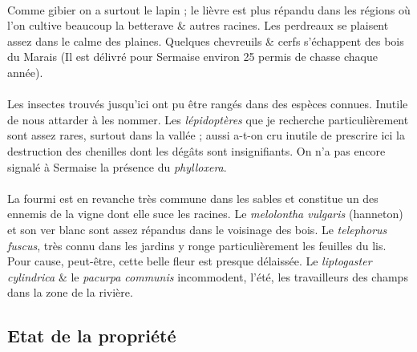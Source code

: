 \documentclass[../eBook.tex]{subfiles}
\begin{document}
    \paragraph{}Comme gibier on a surtout le lapin ; le lièvre est plus répandu dans les régions où l'on cultive beaucoup la betterave \& autres racines. Les perdreaux se plaisent assez dans le calme des plaines. Quelques chevreuils \& cerfs s'échappent des bois du Marais (Il est délivré pour Sermaise environ 25 permis de chasse chaque année).
    \paragraph{}Les insectes trouvés jusqu'ici ont pu être rangés dans des espèces connues. Inutile de nous attarder à les nommer. Les \textit{lépidoptères} que je recherche particulièrement sont assez rares, surtout dans la vallée ; aussi a-t-on cru inutile de prescrire ici la destruction des chenilles dont les dégâts sont insignifiants. On n'a pas encore signalé à Sermaise la présence du \textit{phylloxera}.
    \paragraph{}La fourmi est en revanche très commune dans les sables et constitue un des ennemis de la vigne dont elle suce les racines. Le \textit{melolontha vulgaris} (hanneton) et son ver blanc sont assez répandus dans le voisinage des bois. Le \textit{telephorus fuscus}, très connu dans les jardins y ronge particulièrement les feuilles du lis. Pour cause, peut-être, cette belle fleur est presque délaissée. Le \textit{liptogaster cylindrica} \& le \textit{pacurpa communis} incommodent, l'été, les travailleurs des champs dans la zone de la rivière.

  \subsection*{Etat de la propriété}
\end{document}
